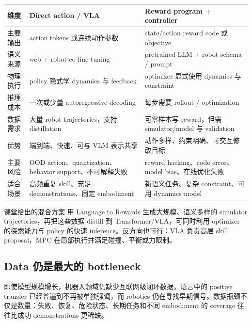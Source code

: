 \begin{longtable}{@{}L{0.20\textwidth}L{0.32\textwidth}L{0.32\textwidth}@{}}
\toprule
维度 & Direct action / VLA & Reward program + controller \\
\midrule
主要输出 & action tokens 或连续动作参数 & state/action reward code 或 objective \\
语义来源 & web + robot co-fine-tuning & pretrained LLM + robot schema / prompt \\
物理执行 & policy 隐式学 dynamics 与 feedback & optimizer 显式使用 dynamics 与 constraint \\
推理成本 & 一次或少量 autoregressive decoding & 每步需要 rollout / optimization \\
数据需求 & 大量 robot trajectories，支持 distillation & 可零样本写 reward，但需 simulator/model 与 validation \\
优势 & 端到端、快速、可与 VLM 表示共享 & 动作多样、约束明确、可交互修改目标 \\
主要风险 & OOD action、quantization、behavior support、不可解释失败 & reward hacking、code error、model bias、在线优化失败 \\
适合场景 & 高频重复 skill、充足 demonstrations、固定 embodiment & 新语义任务、复杂 constraint、可用 dynamics model \\
\bottomrule
\end{longtable}

\begin{importantbox}{课堂给出的混合方案}
用 Language to Rewards 生成大规模、语义多样的 simulator trajectories，再把这些数据 distill 到 Transformer/VLA，可同时利用 optimizer 的探索能力与 policy 的快速 inference。反方向也可行：VLA 负责高层 skill proposal，MPC 在局部执行并满足碰撞、平衡或力限制。
\end{importantbox}


\subsection{Data 仍是最大的 bottleneck}

即使模型规模增长，机器人领域仍缺少互联网级闭环数据。语言中的 positive transfer 已经普遍到不再被单独强调，而 robotics 仍在寻找早期信号。数据瓶颈不仅是数量：失败、恢复、危险状态、长期任务和不同 embodiment 的 coverage 往往比成功 demonstrations 更稀缺。

